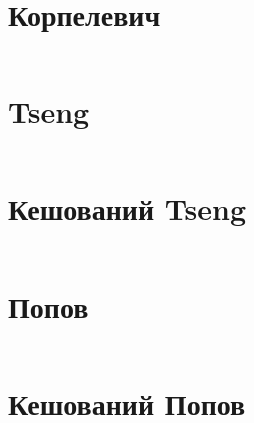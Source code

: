 \newpage

\section{Корпелевич}
\inputminted[linenos,fontsize=\tiny]{python}{src/korpelevich.py}
\newpage

\section{Tseng}
\inputminted[linenos,fontsize=\tiny]{python}{src/tseng.py}
\newpage

\section{Кешований Tseng}
\inputminted[linenos,fontsize=\tiny]{python}{src/cached_tseng.py}
\newpage

\section{Попов}
\inputminted[linenos,fontsize=\tiny]{python}{src/popov.py}
\newpage

\section{Кешований Попов}
\inputminted[linenos,fontsize=\tiny]{python}{src/cached_popov.py}
